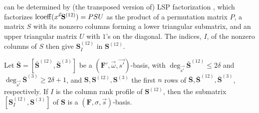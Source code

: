can be determined by (the transposed version of) LSP factorization
\citep{IbarraMH82}, which factorizes $\operatorname{lcoeff}(x^{\vec{s}}\mathbf{S}^{\left(12\right)})=PSU$
as the product of a permutation matrix $P$, a matrix $S$ with its
nonzero columns forming a lower triangular submatrix, and an upper
triangular matrix $U$ with $1$'s on the diagonal. The indices, $I$,
of the nonzero columns of $S$ then give $\mathbf{S}_{I}^{\left(12\right)}$
in $\mathbf{S}^{\left(12\right)}$. 
\begin{thm}
\label{thm:mainTheorem}Let $\bar{\mathbf{S}}=[\bar{\mathbf{S}}^{\left(12\right)},\bar{\mathbf{S}}^{\left(3\right)}]$
be a $(\mathbf{F}',\vec{\omega},\vec{s'})$-basis, with $\deg_{\vec{s'}}\bar{\mathbf{S}}^{\left(12\right)}\le2\delta$
and $\deg_{\vec{s'}}\bar{\mathbf{S}}^{\left(3\right)}\ge2\delta+1$,
and $\mathbf{S},\mathbf{S}^{\left(12\right)},\mathbf{S}^{\left(3\right)}$
the first $n$ rows of $\bar{\mathbf{S}},\bar{\mathbf{S}}^{\left(12\right)},\bar{\mathbf{S}}^{\left(3\right)}$,
respectively. If $I$ is the column rank profile of $\mathbf{S}^{\left(12\right)}$,
then the submatrix \textbf{ $[\mathbf{S}_{I}^{\left(12\right)},\mathbf{S}^{\left(3\right)}]$
}of $\mathbf{S}$ is a $\left(\mathbf{F},\sigma,\vec{s}\right)$-basis. \end{thm}
